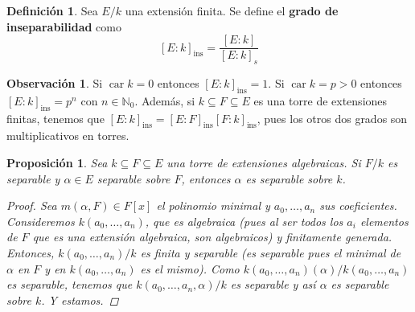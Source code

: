 \documentclass[12pt]{book}
\newtheorem{prop}[teo]{Proposición}
\theoremstyle{definition}
\newtheorem{obs}[teo]{Observación}
\newtheorem{defn}[teo]{Definición}
\newcommand{\NN}{\mathbb{N}}
\DeclareMathOperator{\car}{car}
\begin{document}
\begin{defn}
Sea $E/k$ una extensión finita. Se define el \textbf{grado de inseparabilidad} como $$[E:k]_{\mathrm{ins}} = \dfrac{[E:k]}{[E:k]_s}$$
\end{defn}

\begin{obs}
Si $\car k =0$ entonces $[E:k]_{\mathrm{ins}}=1$. Si $\car k =p>0$ entonces $[E:k]_{\mathrm{ins}} = p^n$ con $n\in\NN_0$. Además, si $k\subseteq F\subseteq E$ es una torre de extensiones finitas, tenemos que $[E:k]_{\mathrm{ins}} = [E:F]_{\mathrm{ins}} [F:k]_{\mathrm{ins}}$, pues los otros dos grados son multiplicativos en torres.
\end{obs}

\begin{prop}
Sea $k\subseteq F\subseteq E$ una torre de extensiones algebraicas. Si $F/k$ es separable y $\alpha\in E$ separable sobre $F$, entonces $\alpha$ es separable sobre $k$.
\begin{proof}
Sea $m(\alpha,F)\in F[x]$ el polinomio minimal y $a_0,\ldots , a_n$ sus coeficientes. Consideremos $k(a_0,\ldots , a_n)$, que es algebraica (pues al ser todos los $a_i$ elementos de $F$ que es una extensión algebraica, son algebraicos) y finitamente generada. Entonces, $k(a_0,\ldots , a_n)/k$ es finita y separable (es separable pues el minimal de $\alpha$ en $F$ y en $k(a_0,\ldots , a_n)$ es el mismo). Como $k(a_0,\ldots ,a_n)(\alpha)/k(a_0,\ldots , a_n)$ es separable, tenemos que $k(a_0,\ldots , a_n,\alpha)/k$ es separable y así $\alpha$ es separable sobre $k$. Y estamos.
\end{proof}
\end{prop}
\end{document}
